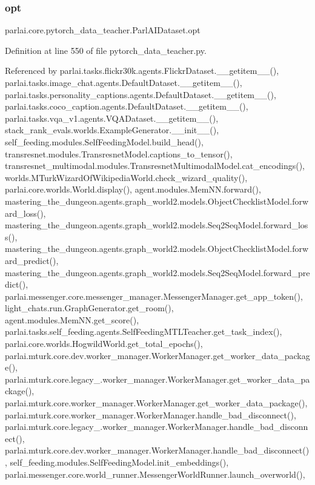 \subsubsection{\texorpdfstring{opt}{opt}}
{\footnotesize\ttfamily parlai.\+core.\+pytorch\+\_\+data\+\_\+teacher.\+Parl\+A\+I\+Dataset.\+opt}



Definition at line 550 of file pytorch\+\_\+data\+\_\+teacher.\+py.



Referenced by parlai.\+tasks.\+flickr30k.\+agents.\+Flickr\+Dataset.\+\_\+\+\_\+getitem\+\_\+\+\_\+(), parlai.\+tasks.\+image\+\_\+chat.\+agents.\+Default\+Dataset.\+\_\+\+\_\+getitem\+\_\+\+\_\+(), parlai.\+tasks.\+personality\+\_\+captions.\+agents.\+Default\+Dataset.\+\_\+\+\_\+getitem\+\_\+\+\_\+(), parlai.\+tasks.\+coco\+\_\+caption.\+agents.\+Default\+Dataset.\+\_\+\+\_\+getitem\+\_\+\+\_\+(), parlai.\+tasks.\+vqa\+\_\+v1.\+agents.\+V\+Q\+A\+Dataset.\+\_\+\+\_\+getitem\+\_\+\+\_\+(), stack\+\_\+rank\+\_\+evals.\+worlds.\+Example\+Generator.\+\_\+\+\_\+init\+\_\+\+\_\+(), self\+\_\+feeding.\+modules.\+Self\+Feeding\+Model.\+build\+\_\+head(), transresnet.\+modules.\+Transresnet\+Model.\+captions\+\_\+to\+\_\+tensor(), transresnet\+\_\+multimodal.\+modules.\+Transresnet\+Multimodal\+Model.\+cat\+\_\+encodings(), worlds.\+M\+Turk\+Wizard\+Of\+Wikipedia\+World.\+check\+\_\+wizard\+\_\+quality(), parlai.\+core.\+worlds.\+World.\+display(), agent.\+modules.\+Mem\+N\+N.\+forward(), mastering\+\_\+the\+\_\+dungeon.\+agents.\+graph\+\_\+world2.\+models.\+Object\+Checklist\+Model.\+forward\+\_\+loss(), mastering\+\_\+the\+\_\+dungeon.\+agents.\+graph\+\_\+world2.\+models.\+Seq2\+Seq\+Model.\+forward\+\_\+loss(), mastering\+\_\+the\+\_\+dungeon.\+agents.\+graph\+\_\+world2.\+models.\+Object\+Checklist\+Model.\+forward\+\_\+predict(), mastering\+\_\+the\+\_\+dungeon.\+agents.\+graph\+\_\+world2.\+models.\+Seq2\+Seq\+Model.\+forward\+\_\+predict(), parlai.\+messenger.\+core.\+messenger\+\_\+manager.\+Messenger\+Manager.\+get\+\_\+app\+\_\+token(), light\+\_\+chats.\+run.\+Graph\+Generator.\+get\+\_\+room(), agent.\+modules.\+Mem\+N\+N.\+get\+\_\+score(), parlai.\+tasks.\+self\+\_\+feeding.\+agents.\+Self\+Feeding\+M\+T\+L\+Teacher.\+get\+\_\+task\+\_\+index(), parlai.\+core.\+worlds.\+Hogwild\+World.\+get\+\_\+total\+\_\+epochs(), parlai.\+mturk.\+core.\+dev.\+worker\+\_\+manager.\+Worker\+Manager.\+get\+\_\+worker\+\_\+data\+\_\+package(), parlai.\+mturk.\+core.\+legacy\+\_.\+worker\+\_\+manager.\+Worker\+Manager.\+get\+\_\+worker\+\_\+data\+\_\+package(), parlai.\+mturk.\+core.\+worker\+\_\+manager.\+Worker\+Manager.\+get\+\_\+worker\+\_\+data\+\_\+package(), parlai.\+mturk.\+core.\+worker\+\_\+manager.\+Worker\+Manager.\+handle\+\_\+bad\+\_\+disconnect(), parlai.\+mturk.\+core.\+legacy\+\_.\+worker\+\_\+manager.\+Worker\+Manager.\+handle\+\_\+bad\+\_\+disconnect(), parlai.\+mturk.\+core.\+dev.\+worker\+\_\+manager.\+Worker\+Manager.\+handle\+\_\+bad\+\_\+disconnect(), self\+\_\+feeding.\+modules.\+Self\+Feeding\+Model.\+init\+\_\+embeddings(), parlai.\+messenger.\+core.\+world\+\_\+runner.\+Messenger\+World\+Runner.\+launch\+\_\+overworld(), 